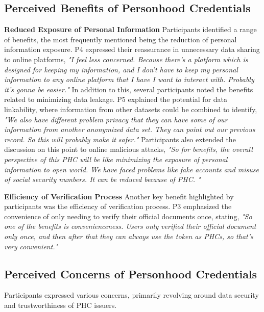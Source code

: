 \subsection{Perceived Benefits of Personhood Credentials}
\textbf{Reduced Exposure of Personal Information} Participants identified a range of benefits, the most frequently mentioned being the reduction of personal information exposure. P4 expressed their reassurance in unnecessary data sharing to online platforms, \textit{"I feel less concerned. Because there's a platform which is designed for keeping my information, and I don't have to keep my personal information to any online platform that I have I want to interact with. Probably it's gonna be easier."} In addition to this, several participants noted the benefits related to minimizing data leakage. P5 explained the potential for data linkability, where information from other datasets could be combined to identify, \textit{"We also have different problem privacy that they can have some of our information from another anonymized data set. They can point out our previous record. So this will probably make it safer."} Participants also extended the discussion on this point to online malicious attacks, \textit{"So for benefits, the overall perspective of this PHC will be like minimizing the exposure of personal information to open world. We have faced problems like fake accounts and misuse of social security numbers. It can be reduced because of PHC. "}

\textbf{Efficiency of Verification Process} Another key benefit highlighted by participants was the efficiency of verification process. P3 emphasized the convenience of only needing to verify their official documents once, stating, \textit{"So one of the benefits is convenienceness. Users only verified their official document only once, and then after that they can always use the token as PHCs, so that's very convenient." }


\subsection{Perceived Concerns of Personhood Credentials}
Participants expressed various concerns, primarily revolving around data security and trustworthiness of PHC issuers. 

